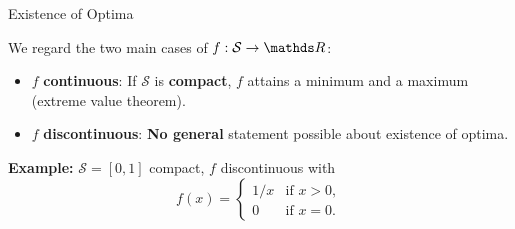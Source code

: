 \documentclass[11pt,compress,t,notes=noshow, xcolor=table]{beamer}
\begin{document}
  
\begin{vbframe}{Existence of Optima}

\dlz

We regard the two main cases of $f : \mathcal{S} \to \R$:

\begin{itemize}
    \item $f$ \textbf{continuous}: If $\mathcal{S}$ is \textbf{compact}, $f$ attains a minimum and a maximum (extreme value theorem).
    \item $f$ \textbf{discontinuous}: \textbf{No general} statement possible about existence of optima.
\end{itemize}

\lz

\textbf{Example:} $\mathcal{S} = [0,1]$ compact, $f$ discontinuous with
\begin{equation*}
    f(x) = \begin{cases}
        1/x & \text{if $x>0$}, \\
        0 & \text{if $x=0$}.
    \end{cases}
\end{equation*}
  
  
\end{vbframe}
    
\end{document}
